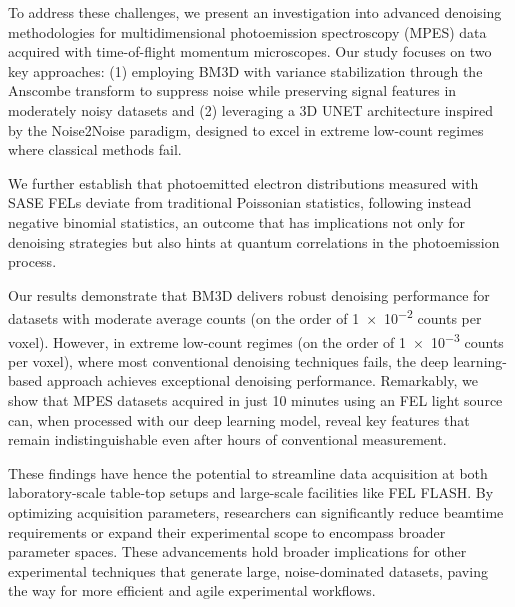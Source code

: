 To address these challenges, we present an investigation into advanced denoising methodologies for multidimensional photoemission spectroscopy (MPES) data acquired with time-of-flight momentum microscopes. Our study focuses on two key approaches: (1) employing BM3D with variance stabilization through the Anscombe transform to suppress noise while preserving signal features in moderately noisy datasets and (2) leveraging a 3D UNET architecture inspired by the Noise2Noise paradigm, designed to excel in extreme low-count regimes where classical methods fail.

We further establish that photoemitted electron distributions measured with SASE FELs deviate from traditional Poissonian statistics, following instead negative binomial statistics, an outcome that has implications not only for denoising strategies but also hints at quantum correlations in the photoemission process.

Our results demonstrate that BM3D delivers robust denoising performance for datasets with moderate average counts (on the order of \num{1e-2} counts per voxel). However, in extreme low-count regimes (on the order of \num{1e-3} counts per voxel), where most conventional denoising techniques fails, the deep learning-based approach achieves exceptional denoising performance. Remarkably, we show that MPES datasets acquired in just 10 minutes using an FEL light source can, when processed with our deep learning model, reveal key features that remain indistinguishable even after hours of conventional measurement.

These findings have hence the potential to streamline data acquisition at both laboratory-scale table-top setups and large-scale facilities like FEL FLASH. By optimizing acquisition parameters, researchers can significantly reduce beamtime requirements or expand their experimental scope to encompass broader parameter spaces. These advancements hold broader implications for other experimental techniques that generate large, noise-dominated datasets, paving the way for more efficient and agile experimental workflows.